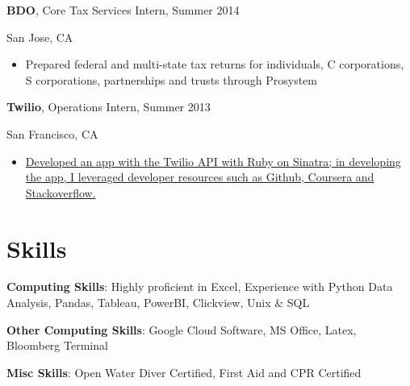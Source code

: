 \documentclass[margin,line]{res}
\begin{document}
\begin{resume}
\vspace*{-3mm}
{\bf BDO},  Core Tax Services Intern, Summer 2014 

\vspace*{-4mm}San Jose, CA
\begin{itemize}[leftmargin=-.13in]
\item Prepared federal and multi-state tax returns for individuals, C corporations, S corporations, partnerships and trusts through Prosystem
\end{itemize}
\vspace*{1.5mm}

\vspace*{-3mm}
{\bf Twilio},  Operations Intern, Summer 2013 

\vspace*{-4mm}San Francisco, CA
\begin{itemize}[leftmargin=-.13in]
\item \href{https://github.com/andrem8/Blood-Alcohol-App}{Developed an app with the Twilio API with Ruby on Sinatra; in developing the app, I leveraged developer resources such as Github, Coursera and Stackoverflow.}  
\end{itemize}

\section{\sc Skills} 
{\bf Computing Skills}:  Highly proficient in Excel, Experience with Python Data Analysis, Pandas, Tableau, PowerBI, Clickview, Unix \& SQL
\vspace*{-3mm}

{\bf Other Computing Skills}: Google Cloud Software, MS Office, Latex, Bloomberg Terminal
\vspace*{-3mm}

{\bf Misc Skills}: Open Water Diver Certified, First Aid and CPR Certified
\vspace*{-3mm}

\end{resume}
\end{document}
